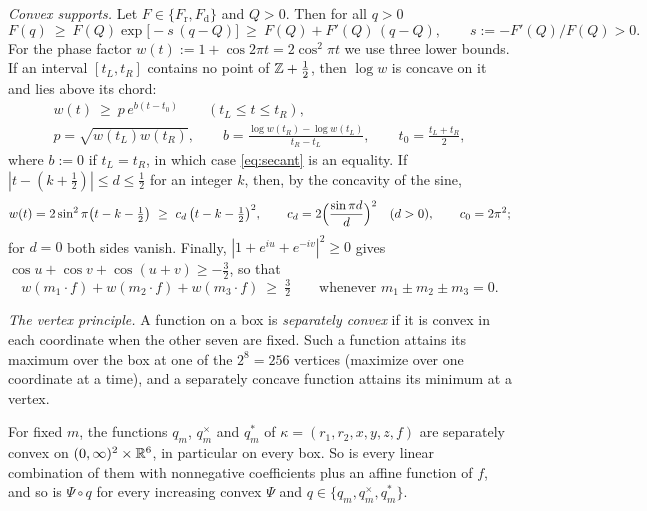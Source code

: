 \emph{Convex supports.} Let $F\in\{F_{\mathrm r},F_{\mathrm d}\}$ and $Q>0$. Then for all $q>0$
\begin{equation}\label{eq:tangent}
  F(q)\ \ge\ F(Q)\exp\bigl[-s\,(q-Q)\bigr]\ \ge\ F(Q)+F'(Q)\,(q-Q),\qquad s:=-F'(Q)/F(Q)>0 .
\end{equation}
For the phase factor $w(t):=1+\cos2\pi t=2\cos^2\pi t$ we use three lower bounds. If an interval $[t_L,t_R]$ contains no point of
$\mathbb Z+\frac12$, then $\log w$ is concave on it and lies above its chord:
\begin{equation}\label{eq:secant}
\begin{gathered}
  w(t)\ \ge\ p\,e^{b(t-t_0)}\qquad(t_L\le t\le t_R),\\
  p=\sqrt{w(t_L)w(t_R)},\qquad b=\frac{\log w(t_R)-\log w(t_L)}{t_R-t_L},\qquad t_0=\frac{t_L+t_R}2 ,
\end{gathered}
\end{equation}
where $b:=0$ if $t_L=t_R$, in which case \eqref{eq:secant} is an equality. If $|t-(k+\frac12)|\le d\le\frac12$ for an integer $k$,
then, by the concavity of the sine,
\begin{equation}\label{eq:extinction}
  w(t)=2\sin^2\pi\bigl(t-k-\tfrac12\bigr)\ \ge\ c_d\,\bigl(t-k-\tfrac12\bigr)^2,\qquad c_d=2\Bigl(\frac{\sin\pi d}d\Bigr)^2\quad(d>0),
  \qquad c_0=2\pi^2 ;
\end{equation}
for $d=0$ both sides vanish.
Finally, $|1+e^{iu}+e^{-iv}|^2\ge0$ gives $\cos u+\cos v+\cos(u+v)\ge-\frac32$, so that
\begin{equation}\label{eq:triad}
  w(m_1\cdot f)+w(m_2\cdot f)+w(m_3\cdot f)\ \ge\ \tfrac32\qquad\text{whenever }m_1\pm m_2\pm m_3=0 .
\end{equation}

\emph{The vertex principle.} A function on a box is \emph{separately convex} if it is convex in each coordinate when the other seven
are fixed. Such a function attains its maximum over the box at one of the $2^8=256$ vertices (maximize over one coordinate at a
time), and a separately concave function attains its minimum at a vertex.

\begin{lemma}\label{lem:sepconv}
For fixed $m$, the functions $q_m$, $q^\times_m$ and $q^*_m$ of $\kappa=(r_1,r_2,x,y,z,f)$ are separately convex on
$(0,\infty)^2\times\mathbb R^6$, in particular on every box. So is
every linear combination of them with nonnegative coefficients plus an affine function of $f$, and so is $\Psi\circ q$ for every
increasing convex $\Psi$ and $q\in\{q_m,q_m^\times,q_m^*\}$.
\end{lemma}

